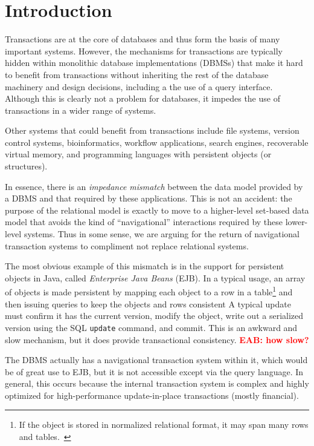\documentclass[letterpaper,twocolumn,english]{article}
\newcommand{\eab}[1]{\textcolor{red}{\bf EAB: #1}}
\begin{document}
\section{Introduction}

Transactions are at the core of databases and thus form the basis of many
important systems. However, the mechanisms for transactions are
typically hidden within monolithic database implementations (DBMSs) that make
it hard to benefit from transactions without inheriting the rest of
the database machinery and design decisions, including a the use of a
query interface.  Although this is clearly not a problem for
databases, it impedes the use of transactions in a wider range of
systems.

Other systems that could benefit from transactions include file
systems, version control systems, bioinformatics, workflow
applications, search engines, recoverable virtual memory, and
programming languages with persistent objects (or structures).

In essence, there is an {\em impedance mismatch} between the data
model provided by a DBMS and that required by these applications. This is
not an accident: the purpose of the relational model is exactly to
move to a higher-level set-based data model that avoids the kind of
``navigational'' interactions required by these lower-level systems.
Thus in some sense, we are arguing for the return of navigational
transaction systems to compliment not replace relational systems.

The most obvious example of this mismatch is in the support for
persistent objects in Java, called {\em Enterprise Java Beans}
(EJB). In a typical usage, an array of objects is made persistent by
mapping each object to a row in a table\footnote{If the object is
stored in normalized relational format, it may span many rows and tables.~\cite{Hibernate}} 
and then issuing queries to
keep the objects and rows consistent  A typical update must confirm
it has the current version, modify the object, write out a serialized
version using the SQL {\tt update} command, and commit.  This is an
awkward and slow mechanism, but it does provide transactional
consistency. \eab{how slow?}

The DBMS actually has a navigational transaction system within it,
which would be of great use to EJB, but it is not accessible except
via the query language.  In general, this occurs because the internal
transaction system is complex and highly optimized for
high-performance update-in-place transactions (mostly financial).
\end{document}
